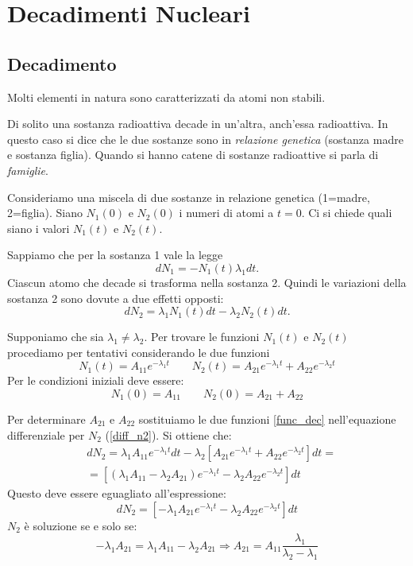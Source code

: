 \chapter{Decadimenti Nucleari}
\section{Decadimento}
Molti elementi in natura sono caratterizzati da atomi non stabili.

Di solito una sostanza radioattiva decade in un'altra, anch'essa radioattiva.
In questo caso si dice che le due sostanze sono in \textit{relazione genetica}
(sostanza madre e sostanza figlia).
Quando si hanno catene di sostanze radioattive si parla di \textit{famiglie}.

Consideriamo una miscela di due sostanze in relazione genetica (1=madre, 
2=figlia).
Siano $N_1(0)$ e $N_2(0)$ i numeri di atomi a $t=0$. Ci si chiede quali siano i
valori $N_1(t)$ e $N_2(t)$.

Sappiamo che per la sostanza 1 vale la legge
\begin{equation}
dN_1=-N_1(t)\lambda_1dt.
\end{equation}
Ciascun atomo che decade si trasforma nella sostanza 2.
Quindi le variazioni della sostanza 2 sono dovute a due effetti opposti:
\begin{equation}
\label{diff_n2}
dN_2=\lambda_1 N_1(t)dt-\lambda_2 N_2(t)dt.
\end{equation}

Supponiamo che sia $\lambda_1\neq\lambda_2$. Per trovare le funzioni $N_1(t)$ e 
$N_2(t)$
procediamo per tentativi considerando le due funzioni
\begin{equation}
\label{func_dec}
N_1(t)=A_{11}e^{-\lambda_1t}\qquad 
N_2(t)=A_{21}e^{-\lambda_1t}+A_{22}e^{-\lambda_2t}
\end{equation}
Per le condizioni iniziali deve essere:
\[
N_1(0)=A_{11}\qquad N_2(0)=A_{21}+A_{22}
\]

Per determinare $A_{21}$ e $A_{22}$ sostituiamo le due funzioni \eqref{func_dec}
nell'equazione differenziale per $N_2$ (\eqref{diff_n2}). Si ottiene che:
\begin{align*}
&dN_2=\lambda_1A_{11}e^{-\lambda_1t}dt-\lambda_2[A_{21}e^{-\lambda_1t}+A_{22}e^{
-\lambda_2t}]dt=\\
&=[(\lambda_1A_{11}-\lambda_2A_{21})e^{-\lambda_1t}-\lambda_2A_{22}e^{-\lambda_2
t}]dt
\end{align*}
Questo deve essere eguagliato all'espressione:
\[
dN_2=[-\lambda_1A_{21}e^{-\lambda_1t}-\lambda_2A_{22}e^{-\lambda_2t}]dt
\]
$N_2$ è soluzione se e solo se:
\[
-\lambda_1A_{21}=\lambda_1A_{11}-\lambda_2A_{21}\Rightarrow 
A_{21}=A_{11}\frac{\lambda_1}{\lambda_2-\lambda_1}
\]

